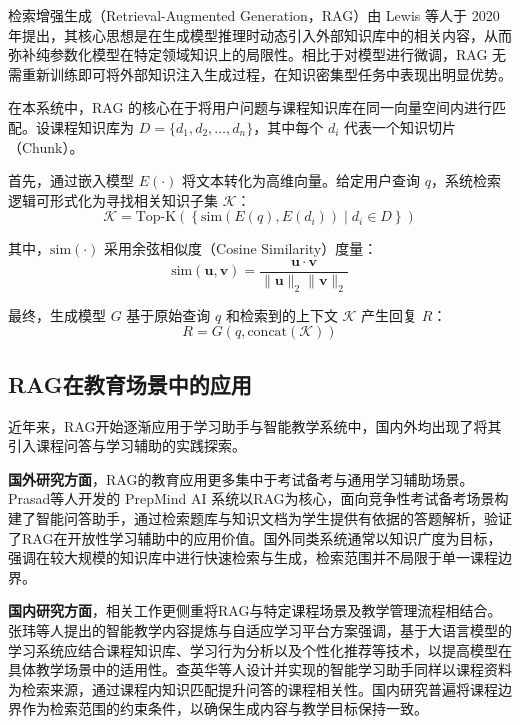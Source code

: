 \documentclass[12pt,a4paper,oneside]{ctexbook}
\numberwithin{equation}{chapter}
\begin{document}
检索增强生成（Retrieval-Augmented Generation，RAG）由 Lewis 等人于 2020 年提出，其核心思想是在生成模型推理时动态引入外部知识库中的相关内容，从而弥补纯参数化模型在特定领域知识上的局限性\cite{ref15}。相比于对模型进行微调，RAG 无需重新训练即可将外部知识注入生成过程，在知识密集型任务中表现出明显优势。

在本系统中，RAG 的核心在于将用户问题与课程知识库在同一向量空间内进行匹配。设课程知识库为 $D = \{d_1, d_2, \dots, d_n\}$，其中每个 $d_i$ 代表一个知识切片（Chunk）。

首先，通过嵌入模型 $E(\cdot)$ 将文本转化为高维向量。给定用户查询 $q$，系统检索逻辑可形式化为寻找相关知识子集 $\mathcal{K}$：
\begin{equation}
\mathcal{K} = \text{Top-K} \left( \left\{ \text{sim}(E(q), E(d_i)) \mid d_i \in D \right\} \right)
\end{equation}

其中，$\text{sim}(\cdot)$ 采用余弦相似度（Cosine Similarity）度量：
\begin{equation}
\text{sim}(\mathbf{u}, \mathbf{v}) = \frac{\mathbf{u} \cdot \mathbf{v}}{\|\mathbf{u}\|_2 \|\mathbf{v}\|_2}
\end{equation}

最终，生成模型 $G$ 基于原始查询 $q$ 和检索到的上下文 $\mathcal{K}$ 产生回复 $R$：
\begin{equation}
R = G(q, \text{concat}(\mathcal{K}))
\end{equation}

\subsection{RAG在教育场景中的应用}

近年来，RAG开始逐渐应用于学习助手与智能教学系统中，国内外均出现了将其引入课程问答与学习辅助的实践探索。

\textbf{国外研究方面}，RAG的教育应用更多集中于考试备考与通用学习辅助场景。Prasad等人开发的 PrepMind AI 系统以RAG为核心，面向竞争性考试备考场景构建了智能问答助手，通过检索题库与知识文档为学生提供有依据的答题解析，验证了RAG在开放性学习辅助中的应用价值\cite{ref3}。国外同类系统通常以知识广度为目标，强调在较大规模的知识库中进行快速检索与生成，检索范围并不局限于单一课程边界。

\textbf{国内研究方面}，相关工作更侧重将RAG与特定课程场景及教学管理流程相结合。张玮等人提出的智能教学内容提炼与自适应学习平台方案强调，基于大语言模型的学习系统应结合课程知识库、学习行为分析以及个性化推荐等技术，以提高模型在具体教学场景中的适用性\cite{ref4}。查英华等人设计并实现的智能学习助手同样以课程资料为检索来源，通过课程内知识匹配提升问答的课程相关性\cite{ref8}。国内研究普遍将课程边界作为检索范围的约束条件，以确保生成内容与教学目标保持一致。
\end{document}
